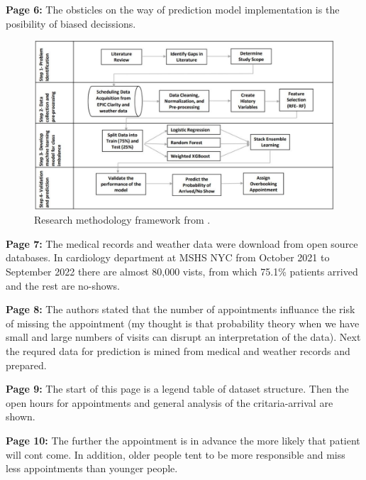     \textbf{Page 6:}
    The obsticles on the way of prediction model implementation is the posibility of biased decissions.
    \begin{figure}[H]
        \centering
        \includegraphics[width=1\textwidth]{figures/SM0006US23/fig1.png}
        \caption{Research methodology framework from \cite{x147}.}
        \label{fig1:SM0006US23}
    \end{figure}

    \textbf{Page 7:}
    The medical records and weather data were download from open source databases. In cardiology department at MSHS NYC from October 2021 to September 2022 there are almost 80,000 vists, from which 75.1\% patients arrived and the rest are no-shows.

    \textbf{Page 8:}
    The authors stated that the number of appointments influance the risk of missing the appointment (my thought is that probability theory when we have small and large numbers of visits can disrupt an interpretation of the data). Next the requred data for prediction is mined from medical and weather records and prepared.

    \textbf{Page 9:}
    The start of this page is a legend table of dataset structure. Then the open hours for appointments and general analysis of the critaria-arrival are shown.
    
    \textbf{Page 10:}
    The further the appointment is in advance the more likely that patient will cont come. In addition, older people tent to be more responsible and miss less appointments than younger people.
    
